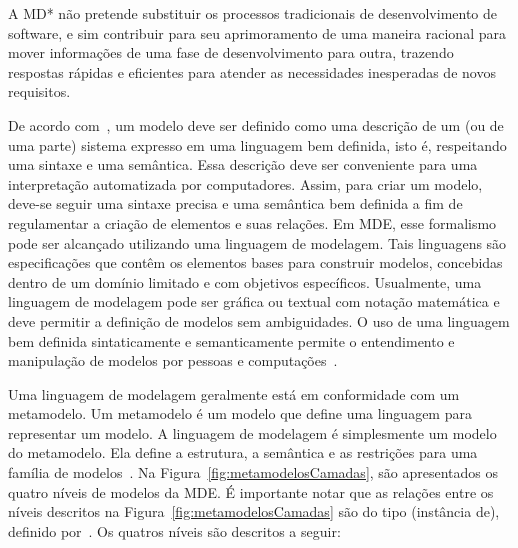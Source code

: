 A MD* não pretende substituir os processos tradicionais de desenvolvimento de software, e sim contribuir para seu aprimoramento de uma maneira racional para mover informações de uma fase de desenvolvimento para outra, trazendo respostas rápidas e eficientes para atender as necessidades inesperadas de novos requisitos.

De acordo com~, um modelo deve ser definido como uma descrição de um (ou de uma parte) sistema expresso em uma linguagem bem definida, isto é, respeitando uma sintaxe e uma semântica. Essa descrição deve ser conveniente para uma interpretação automatizada por computadores. Assim, para criar um modelo, deve-se seguir uma sintaxe precisa e uma semântica bem definida a fim de regulamentar a criação de elementos e suas relações. Em MDE, esse formalismo pode ser alcançado utilizando uma linguagem de modelagem. Tais linguagens são especificações que contêm os elementos bases para construir modelos, concebidas dentro de um domínio limitado e com objetivos específicos. Usualmente, uma linguagem de modelagem pode ser gráfica ou textual com notação matemática e deve permitir a definição de modelos sem ambiguidades. O uso de uma linguagem bem definida sintaticamente e semanticamente permite o entendimento e manipulação de modelos por pessoas e computações~\cite{Hutchinson_2011, France_2007, Schmidt_2006}.

Uma linguagem de modelagem geralmente está em conformidade com um metamodelo. Um metamodelo é um modelo que define uma linguagem para representar um modelo. A linguagem de modelagem é simplesmente um modelo do metamodelo. Ela define a estrutura, a semântica e as restrições para uma família de modelos~\cite{Mellor_2004}. Na Figura~\ref{fig:metamodelosCamadas}, são apresentados os quatro níveis de modelos da MDE. É importante notar que as relações entre os níveis descritos na Figura~\ref{fig:metamodelosCamadas} são do tipo  (instância de), definido por~. Os quatros níveis são descritos a seguir: 

